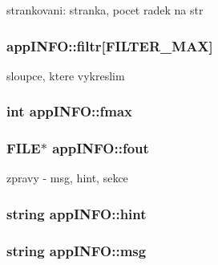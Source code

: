 strankovani\-: stranka, pocet radek na str 

\hypertarget{structappINFO_a23c6e7c58add373c270611f2fd0bdca1}{
\subsubsection[{filtr}]{ {\bf app\-I\-N\-F\-O\-::filtr}\mbox{[}\-F\-I\-L\-T\-E\-R\-\_\-\-M\-A\-X\mbox{]}}}
\label{d3/d7d/structappINFO_a23c6e7c58add373c270611f2fd0bdca1}


sloupce, ktere vykreslim 

\hypertarget{structappINFO_a97c8f57e46a015eb2f9a2ddf73348f25}{
\subsubsection[{fmax}]{\setlength{\rightskip}{0pt plus 5cm}int {\bf app\-I\-N\-F\-O\-::fmax}}}
\label{d3/d7d/structappINFO_a97c8f57e46a015eb2f9a2ddf73348f25}
\hypertarget{structappINFO_abb0511ea3f7fa90338f6cf28a78eb8fd}{
\subsubsection[{fout}]{\setlength{\rightskip}{0pt plus 5cm}\-F\-I\-L\-E$\ast$ {\bf app\-I\-N\-F\-O\-::fout}}}
\label{d3/d7d/structappINFO_abb0511ea3f7fa90338f6cf28a78eb8fd}


zpravy -\/ msg, hint, sekce 

\hypertarget{structappINFO_a5c23293cc828613f5ce00b3ac415b23e}{
\subsubsection[{hint}]{\setlength{\rightskip}{0pt plus 5cm}string {\bf app\-I\-N\-F\-O\-::hint}}}
\label{d3/d7d/structappINFO_a5c23293cc828613f5ce00b3ac415b23e}
\hypertarget{structappINFO_ad3bf01db2ebdae4bbc4b14963751c2a8}{
\subsubsection[{msg}]{\setlength{\rightskip}{0pt plus 5cm}string {\bf app\-I\-N\-F\-O\-::msg}}}
\label{d3/d7d/structappINFO_ad3bf01db2ebdae4bbc4b14963751c2a8}


